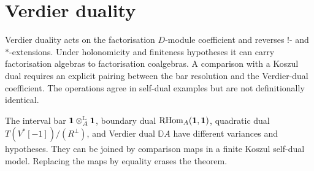 \section{Verdier duality}
Verdier duality acts on the factorisation \(D\)-module coefficient and reverses \(!\)- and \(*\)-extensions.  Under holonomicity and finiteness hypotheses it can carry factorisation algebras to factorisation coalgebras.  A comparison with a Koszul dual requires an explicit pairing between the bar resolution and the Verdier-dual coefficient.  The operations agree in self-dual examples but are not definitionally identical.

\begin{nogobox}[title={No-go theorem 12: four dualities are not one operation}]
The interval bar \(\mathbf 1\otimes_A^{\mathbb L}\mathbf 1\), boundary dual \(\operatorname{RHom}_A(\mathbf 1,\mathbf 1)\), quadratic dual \(T(V^*[-1])/(R^\perp)\), and Verdier dual \(\mathbb D A\) have different variances and hypotheses.  They can be joined by comparison maps in a finite Koszul self-dual model.  Replacing the maps by equality erases the theorem.
\end{nogobox}
